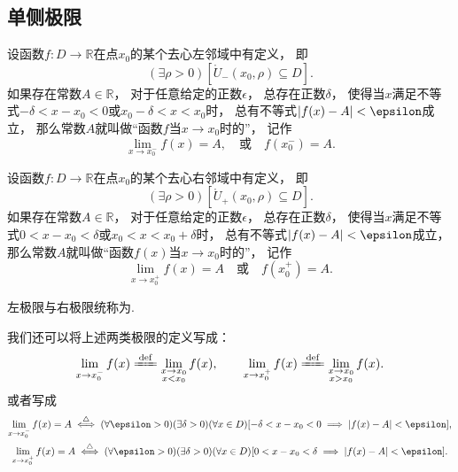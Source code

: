 \subsection{单侧极限}
\begin{definition}\label{definition:极限.函数极限的定义2}
设函数\(f\colon D\to\mathbb{R}\)在点\(x_0\)的某个去心左邻域中有定义，
即\[
	(\exists\rho>0)
	[\mathring{U}_-(x_0,\rho) \subseteq D].
\]
如果存在常数\(A\in\mathbb{R}\)，
对于任意给定的正数\(\epsilon\)，
总存在正数\(\delta\)，
使得当\(x\)满足不等式\(-\delta < x - x_0 < 0\)或\(x_0 - \delta < x < x_0\)时，
总有不等式\(\abs{f(x) - A} < \epsilon\)成立，
那么常数\(A\)就叫做“函数\(f\)当\(x \to x_0\)时的”，
记作\[
	\lim_{x \to x_0^-} f(x) = A,
	\quad\text{或}\quad
	f(x_0^-) = A.
\]
\end{definition}

\begin{definition}\label{definition:极限.函数极限的定义3}
设函数\(f\colon D\to\mathbb{R}\)在点\(x_0\)的某个去心右邻域中有定义，
即\[
	(\exists\rho>0)
	[\mathring{U}_+(x_0,\rho) \subseteq D].
\]
如果存在常数\(A\in\mathbb{R}\)，
对于任意给定的正数\(\epsilon\)，
总存在正数\(\delta\)，
使得当\(x\)满足不等式\(0 < x - x_0 < \delta\)或\(x_0 < x < x_0 + \delta\)时，
总有不等式\(\abs{f(x) - A} < \epsilon\)成立，
那么常数\(A\)就叫做“函数\(f(x)\)当\(x \to x_0\)时的”，
记作\[
	\lim_{x \to x_0^+} f(x) = A
	\quad\text{或}\quad
	f(x_0^+) = A.
\]
\end{definition}

左极限与右极限统称为.

\begin{remark}
我们还可以将上述两类极限的定义写成：\begin{gather*}
	\lim_{x \to x_0^-} f(x)
	\defeq
	\lim_{\substack{x \to x_0 \\ x < x_0}} f(x), \qquad
	\lim_{x \to x_0^+} f(x)
	\defeq
	\lim_{\substack{x \to x_0 \\ x > x_0}} f(x).
\end{gather*}
或者写成\begin{gather*}
	\lim_{x \to x_0^-} f(x) = A
	\defiff
	(\forall \epsilon > 0)
	(\exists \delta > 0)
	(\forall x \in D)
	[-\delta < x - x_0 < 0 \implies \abs{f(x) - A} < \epsilon], \\
	\lim_{x \to x_0^+} f(x) = A
	\defiff
	(\forall \epsilon > 0)
	(\exists \delta > 0)
	(\forall x \in D)
	[0 < x - x_0 < \delta \implies \abs{f(x) - A} < \epsilon].
\end{gather*}
\end{remark}


